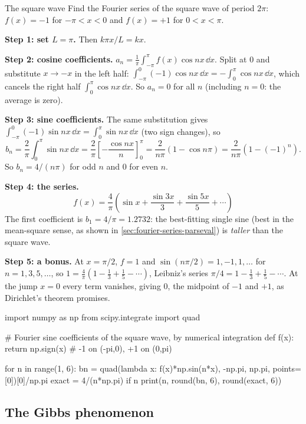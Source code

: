 \begin{sample}{The square wave}
Find the Fourier series of the square wave of period $2\pi$: $f(x)=-1$ for $-\pi<x<0$ and $f(x)=+1$ for $0<x<\pi$.

\textbf{Step 1: set $L=\pi$.} Then $k\pi x/L=kx$.

\textbf{Step 2: cosine coefficients.} $a_n=\frac1\pi\int_{-\pi}^{\pi}f(x)\cos nx\,\dd x$. Split at $0$ and substitute $x\to-x$ in the left half:
$\int_{-\pi}^0(-1)\cos nx\,\dd x=-\int_0^{\pi}\cos nx\,\dd x$, which cancels the right half $\int_0^\pi\cos nx\,\dd x$. So $a_n=0$ for all $n$ (including $n=0$: the average is zero).

\textbf{Step 3: sine coefficients.} The same substitution gives $\int_{-\pi}^0(-1)\sin nx\,\dd x=\int_0^\pi\sin nx\,\dd x$ (two sign changes), so
\[
b_n=\frac2\pi\int_0^\pi\sin nx\,\dd x=\frac2\pi\left[-\frac{\cos nx}{n}\right]_0^\pi=\frac{2}{n\pi}\left(1-\cos n\pi\right)=\frac{2}{n\pi}\left(1-(-1)^n\right).
\]
So $b_n=4/(n\pi)$ for odd $n$ and $0$ for even $n$.

\textbf{Step 4: the series.}
\[
\boxed{f(x)=\frac4\pi\left(\sin x+\frac{\sin3x}{3}+\frac{\sin5x}{5}+\cdots\right)}
\]
The first coefficient is $b_1=4/\pi=1.2732$: the best-fitting single sine (best in the mean-square sense, as shown in \cref{sec:fourier-series-parseval}) is \emph{taller} than the square wave.

\textbf{Step 5: a bonus.} At $x=\pi/2$, $f=1$ and $\sin(n\pi/2)=1,-1,1,\dots$ for $n=1,3,5,\dots$, so $1=\frac4\pi(1-\frac13+\frac15-\cdots)$, Leibniz's series $\pi/4=1-\tfrac13+\tfrac15-\cdots$. At the jump $x=0$ every term vanishes, giving $0$, the midpoint of $-1$ and $+1$, as Dirichlet's theorem promises.
\end{sample}

\begin{pycode}
import numpy as np
from scipy.integrate import quad

# Fourier sine coefficients of the square wave, by numerical integration
def f(x):
    return np.sign(x)            # -1 on (-pi,0), +1 on (0,pi)

for n in range(1, 6):
    bn = quad(lambda x: f(x)*np.sin(n*x), -np.pi, np.pi, points=[0])[0]/np.pi
    exact = 4/(n*np.pi) if n %
    print(n, round(bn, 6), round(exact, 6))
\end{pycode}

\subsection{The Gibbs phenomenon}\label{sec:fourier-series-gibbs}


